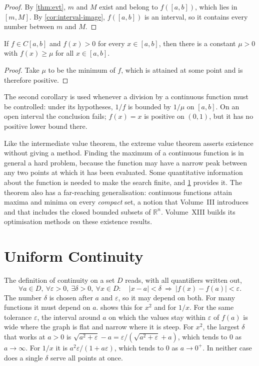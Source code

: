 \begin{proof}
By \cref{thm:evt}, $m$ and $M$ exist and belong to $f([a,b])$, which lies in $[m,M]$. By \cref{cor:interval-image}, $f([a,b])$ is an interval, so it contains every number between $m$ and $M$.
\end{proof}

\begin{corollary}
\label{cor:positive-lower-bound}
If $f\in C[a,b]$ and $f(x)>0$ for every $x\in[a,b]$, then there is a constant $\mu>0$ with $f(x)\ge\mu$ for all $x\in[a,b]$.
\end{corollary}

\begin{proof}
Take $\mu$ to be the minimum of $f$, which is attained at some point and is therefore positive.
\end{proof}

The second corollary is used whenever a division by a continuous function must be controlled: under its hypotheses, $1/f$ is bounded by $1/\mu$ on $[a,b]$. On an open interval the conclusion fails; $f(x)=x$ is positive on $(0,1)$, but it has no positive lower bound there.

Like the intermediate value theorem, the extreme value theorem asserts existence without giving a method. Finding the maximum of a continuous function is in general a hard problem, because the function may have a narrow peak between any two points at which it has been evaluated. Some quantitative information about the function is needed to make the search finite, and \cref{sec:uniform} provides it. The theorem also has a far-reaching generalisation: continuous functions attain maxima and minima on every \emph{compact} set, a notion that Volume~III introduces and that includes the closed bounded subsets of $\mathbb R^n$. Volume~XIII builds its optimisation methods on these existence results.

\section{Uniform Continuity}
\label{sec:uniform}

The definition of continuity on a set $D$ reads, with all quantifiers written out,
\[
\forall a\in D,\ \forall\varepsilon>0,\ \exists\delta>0,\ \forall x\in D:\quad|x-a|<\delta\ \Rightarrow\ |f(x)-f(a)|<\varepsilon .
\]
The number $\delta$ is chosen after $a$ and $\varepsilon$, so it may depend on both. For many functions it must depend on $a$.  shows this for $x^2$ and for $1/x$. For the same tolerance $\varepsilon$, the interval around $a$ on which the values stay within $\varepsilon$ of $f(a)$ is wide where the graph is flat and narrow where it is steep. For $x^2$, the largest $\delta$ that works at $a>0$ is $\sqrt{a^2+\varepsilon}-a=\varepsilon/(\sqrt{a^2+\varepsilon}+a)$, which tends to $0$ as $a\to\infty$. For $1/x$ it is $a^2\varepsilon/(1+a\varepsilon)$, which tends to $0$ as $a\to0^+$. In neither case does a single $\delta$ serve all points at once.

